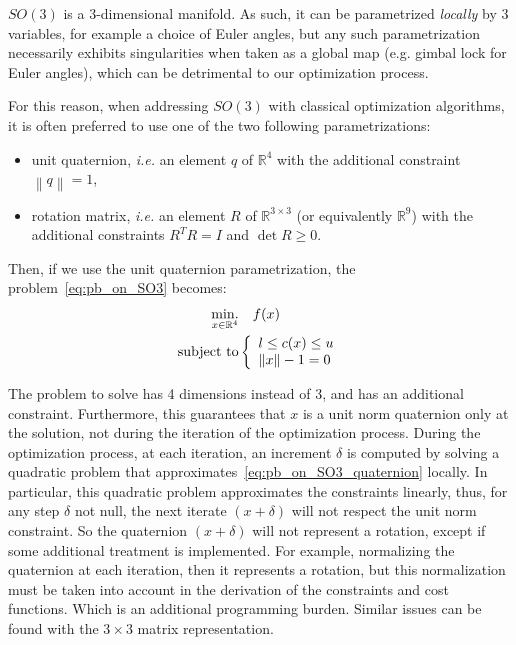 $SO(3)$ is a 3-dimensional manifold.
As such, it can be parametrized \emph{locally} by $3$ variables, for example a choice of Euler angles, but any such parametrization necessarily exhibits singularities when taken as a global map (e.g. gimbal lock for Euler angles), which can be detrimental to our optimization process.

For this reason, when addressing $SO(3)$ with classical optimization algorithms, it is often preferred to use one of the two following parametrizations:
\begin{itemize}
    \item unit quaternion, \emph{i.e.} an element $q$ of $\mathbb{R}^4$ with the additional constraint $\left\|q\right\| = 1$,
    \item rotation matrix, \emph{i.e.} an element $R$ of $\mathbb{R}^{3 \times 3}$ (or equivalently $\mathbb{R}^9$) with the additional constraints $R^T R = I$ and $\det{R} \geq 0$.
\end{itemize}

Then, if we use the unit quaternion parametrization, the problem~\ref{eq:pb_on_SO3} becomes:
\begin{align}
\label{eq:pb_on_SO3_quaternion}
  \operatorname*{min.}_{x \in \mathbb{R}^4} & \quad f(x)\\
  \text{subject to}&
  \left\{\begin{array}{lr}
    {l} \leq c(x) \leq {u} \nonumber\\
    \|x\| - 1 = 0
  \end{array}\right.
\end{align}

The problem to solve has 4 dimensions instead of 3, and has an additional constraint.
Furthermore, this guarantees that $x$ is a unit norm quaternion only at the solution, not during the iteration of the optimization process.
During the optimization process, at each iteration, an increment $\delta$ is computed by solving a quadratic problem that approximates~\ref{eq:pb_on_SO3_quaternion} locally.
In particular, this quadratic problem approximates the constraints linearly, thus, for any step $\delta$ not null, the next iterate $(x+\delta)$ will not respect the unit norm constraint.
So the quaternion $(x+\delta)$ will not represent a rotation, except if some additional treatment is implemented.
For example, normalizing the quaternion at each iteration, then it represents a rotation, but this normalization must be taken into account in the derivation of the constraints and cost functions.
Which is an additional programming burden.
Similar issues can be found with the $3\times 3$ matrix representation.

